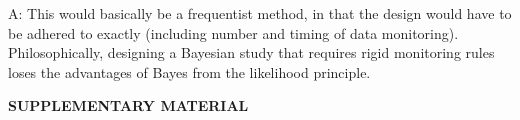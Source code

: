 \documentclass[12pt]{article}
\begin{document}
A: This would basically be a frequentist method, in that the design would have to be adhered to exactly (including number and timing of data monitoring). Philosophically, designing a Bayesian study that requires rigid monitoring rules loses the advantages of Bayes from the likelihood principle.
%
%
%
%
%				
%
%


%
			


\newpage
\begin{center}
{\large\bf SUPPLEMENTARY MATERIAL}
\end{center}
\end{document}
